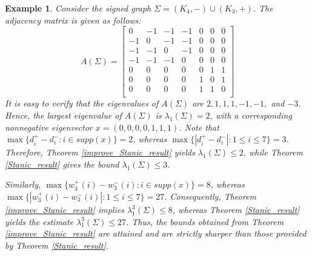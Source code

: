 \documentclass[12pt]{article}
\theoremstyle{plain}
\newtheorem{example}{Example}[section]
\numberwithin{equation}{section}
\begin{document}
	\begin{example}
		Consider the signed graph $\Sigma=(K_{4}, -)\cup(K_{3},+)$. The adjacency matrix is given as follows: $$A(\Sigma)=\begin{bmatrix}
			0&-1&-1&-1&0&0 &0 \\
			-1&0&-1&-1&0&0 &0 \\
			-1&-1&0&-1&0&0 &0 \\
			-1&-1&-1&0&0&0 &0 \\
			0&0&0&0&0&1 &1 \\
			0&0&0&0&1&0 &1 \\
			0&0&0&0&1&1 &0 \\   
		\end{bmatrix}$$
		It is easy to verify that the eigenvalues of $A(\Sigma)$ are $2, 1, 1, 1, -1, -1,$ and $-3$. Hence, the largest eigenvalue of $A(\Sigma)$ is $\lambda_{1}(\Sigma)=2$, with a corresponding nonnegative eigenvector $x=(0,0,0,0,1,1,1)$. Note that $\max\{d_{i}^{+}-d_{i}^{-}:i \in supp(x)\}=2$, whereas $\max\{|d_{i}^{+}-d_{i}^{-}|:1\leq i\leq 7\}=3$. Therefore, Theorem \ref{improve_Stanic_result} yields $\lambda_{1}(\Sigma)\leq 2$, while Theorem \ref{Stanic_result} gives the bound $\lambda_{1}(\Sigma)\leq 3$.
		
		Similarly, $\max\{w_{3}^{+}(i)-w_{3}^{-}(i):i \in supp(x)\}=8$, whereas $\max\{|w_{3}^{+}(i)-w_{3}^{-}(i)|:1\leq i\leq 7\}=27$. Consequently, Theorem \ref{improve_Stanic_result} implies $\lambda_{1}^{3}(\Sigma)\leq 8$, whereas Theorem \ref{Stanic_result} yields the estimate $\lambda_{1}^{3}(\Sigma)\leq 27$. Thus, the bounds obtained from Theorem \ref{improve_Stanic_result} are attained and are strictly sharper than those provided by Theorem \ref{Stanic_result}. 
	\end{example} 
	
\end{document}
